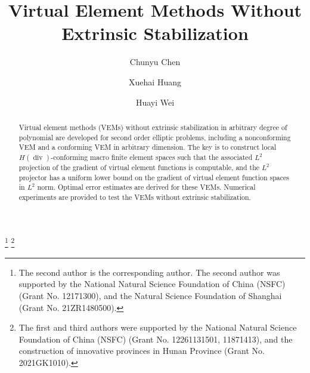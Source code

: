 \documentclass[10pt]{amsart}
\renewcommand{\div}{\operatorname{div}}
\numberwithin{equation}{section}
\begin{document}
\title[Stabilization-Free VEM]{Virtual Element Methods Without Extrinsic Stabilization}
\author{Chunyu Chen}%
\address{Hunan Key Laboratory for Computation and Simulation in Science and Engineering; School of Mathematics and Computational Science, Xiangtan University, Xiangtan 411105, P.R.China }%
 \author{Xuehai Huang}%
 \address{School of Mathematics, Shanghai University of Finance and Economics, Shanghai 200433, China}%
\author{Huayi Wei}%
\address{Hunan Key Laboratory for Computation and Simulation in Science and Engineering; School of Mathematics and Computational Science, Xiangtan University, Xiangtan 411105, P.R.China }%

 \thanks{The second author is the corresponding author. The second author was supported by the National Natural Science Foundation of
China (NSFC) (Grant No. 12171300), and the Natural Science Foundation of Shanghai
(Grant No. 21ZR1480500).}
 \thanks{The first and third authors were supported by the National Natural
Science Foundation of China (NSFC) (Grant No. 12261131501, 11871413), and the construction of innovative provinces in Hunan Province (Grant No. 2021GK1010).}

\makeatletter
{}
\makeatother
{}

\begin{abstract}
Virtual element methods (VEMs) without extrinsic stabilization in arbitrary degree of polynomial are developed for second order elliptic problems, including a nonconforming VEM and a conforming VEM in arbitrary dimension. The key is to construct local $H(\div)$-conforming macro finite element spaces such that the associated $L^2$ projection of the gradient of virtual element functions is computable, and the $L^2$ projector has a uniform lower bound on the gradient of virtual element function spaces in $L^2$ norm. Optimal error estimates are derived for these VEMs. Numerical experiments are provided to test the VEMs without extrinsic stabilization.
\end{abstract}
\end{document}
